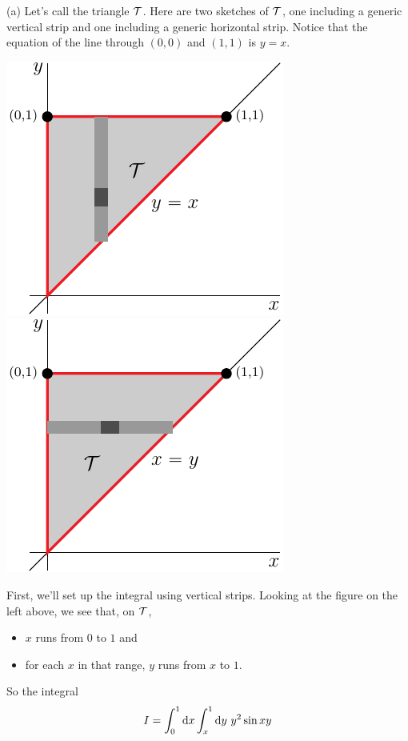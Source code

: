 \begin{solution}
(a) Let's call the triangle $\mathcal{T}$.
Here are two sketches of $\mathcal{T}$, one including a generic vertical strip
and one including a generic horizontal strip. Notice that the equation
of the line through $(0,0)$ and $(1,1)$ is $y=x$.

\begin{center}
     \includegraphics{fig/OE09A_5v.pdf}\qquad
     \includegraphics{fig/OE09A_5h.pdf}\qquad
\end{center}

First, we'll set up the integral using vertical strips. Looking
at the figure on the left above, we see that, on $\mathcal{T}$,
\begin{itemize}
\item
$x$ runs from $0$ to $1$ and
\item
for each $x$ in that range, $y$ runs from $x$ to $1$.
\end{itemize}
So the integral
\begin{align*}
I=\int_0^1\mathrm{d}x\int_x^1\mathrm{d}y\ y^2\sin xy
\end{align*}


\end{solution}
